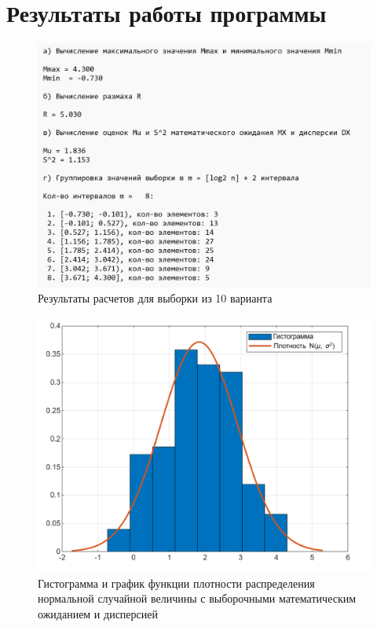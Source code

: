\chapter{Результаты работы программы}

\begin{figure}[h]
	\centering
	\includegraphics[scale=0.95]{images/prog_out.png}
	\caption{Результаты расчетов для выборки из 10 варианта}
	\label{fig:result}
\end{figure}

\begin{figure}[h]
	\centering
	\includegraphics[scale=0.5]{images/gisto.png}
	\caption{Гистограмма и график функции плотности распределения нормальной случайной величины с выборочными математическим ожиданием и дисперсией}
	\label{fig:histo}
\end{figure}

